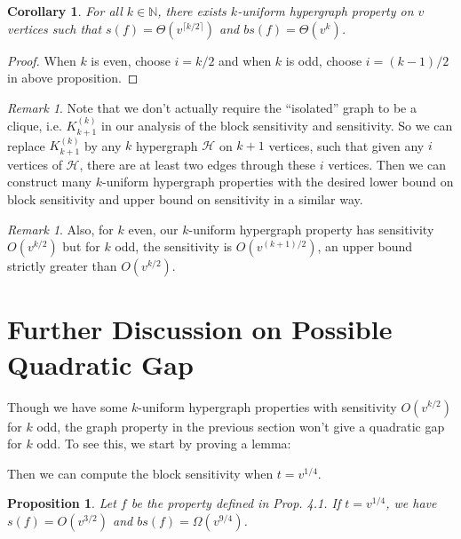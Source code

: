 \documentclass[psamsfonts]{amsart}
\newtheorem{cor}[theorem]{Corollary}
\newtheorem{prop}[theorem]{Proposition}
\theoremstyle{definition}
\theoremstyle{remark}
\newtheorem{rem}[theorem]{Remark}
\numberwithin{equation}{section}
\begin{document}
	\begin{cor}
		For all $k \in \mathbb{N}$, there exists $k$-uniform hypergraph property on $v$ vertices such that $s(f) = \Theta(v^{\lceil k/2 \rceil})$ and $bs(f)= \Theta (v^k)$.
	\end{cor}
	\begin{proof}
		When $k$ is even, choose $i=k/2$ and when $k$ is odd, choose $i=(k-1)/2$ in above proposition.
	\end{proof}
	
	\begin{rem}
		Note that we don't actually require the ``isolated'' graph to be a clique, i.e. $K_{k+1}^{(k)}$ in our analysis of the block sensitivity and sensitivity. So we can replace $K_{k+1}^{(k)}$ by any $k$ hypergraph $\mathcal{H}$ on $k+1$ vertices, such that given any $i$ vertices of $\mathcal{H}$, there are at least two edges through these $i$ vertices. Then we can construct many $k$-uniform hypergraph properties with the desired lower bound on block sensitivity and upper bound on sensitivity in a similar way.
	\end{rem}
	
	\begin{rem}
		Also, for $k$ even, our $k$-uniform hypergraph property has sensitivity $O(v^{k/2})$ but for $k$ odd, the sensitivity is $O(v^{(k+1)/2})$, an upper bound strictly greater than $O(v^{k/2})$.
	\end{rem}
	

	\section{Further Discussion on Possible Quadratic Gap}
		Though we have some $k$-uniform hypergraph properties with sensitivity $O(v^{k/2})$ for $k$ odd,
the graph property in the previous section won't give a quadratic gap for $k$ odd. To see this, we start by proving a lemma:	
	
	Then we can compute the block sensitivity when $t = v^{1/4}$.
	\begin{prop}
		Let $f$ be the property defined in Prop. 4.1. If $t = v^{1/4}$, we have $s(f) = O(v^{3/2})$ and $bs(f) = \Omega(v^{9/4})$.
	\end{prop}
	
\end{document}
